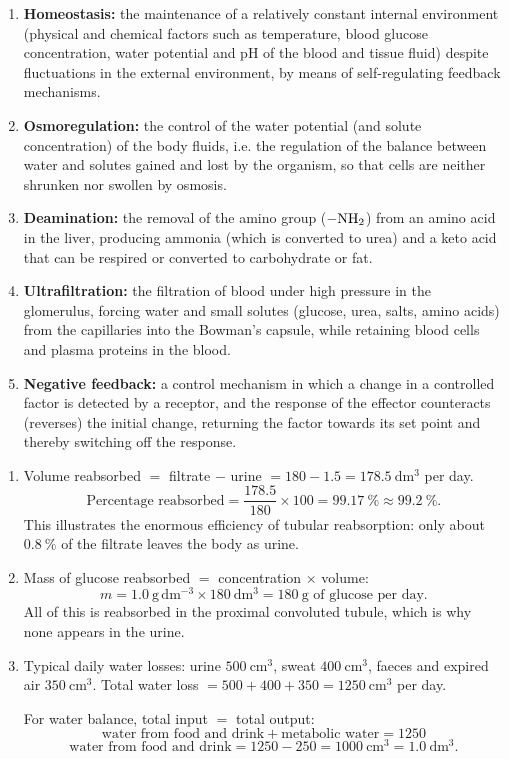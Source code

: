 \documentclass[11pt]{article}
\begin{document}
\begin{corrige}
\begin{enumerate}
\item \textbf{Homeostasis:} the maintenance of a relatively constant internal environment (physical and chemical factors such as temperature, blood glucose concentration, water potential and pH of the blood and tissue fluid) despite fluctuations in the external environment, by means of self-regulating feedback mechanisms.
\item \textbf{Osmoregulation:} the control of the water potential (and solute concentration) of the body fluids, i.e. the regulation of the balance between water and solutes gained and lost by the organism, so that cells are neither shrunken nor swollen by osmosis.
\item \textbf{Deamination:} the removal of the amino group ($-\ce{NH2}$) from an amino acid in the liver, producing ammonia (which is converted to urea) and a keto acid that can be respired or converted to carbohydrate or fat.
\item \textbf{Ultrafiltration:} the filtration of blood under high pressure in the glomerulus, forcing water and small solutes (glucose, urea, salts, amino acids) from the capillaries into the Bowman's capsule, while retaining blood cells and plasma proteins in the blood.
\item \textbf{Negative feedback:} a control mechanism in which a change in a controlled factor is detected by a receptor, and the response of the effector counteracts (reverses) the initial change, returning the factor towards its set point and thereby switching off the response.
\end{enumerate}
\end{corrige}

\begin{corrige}
\begin{enumerate}
\item Volume reabsorbed $=$ filtrate $-$ urine $= 180 - 1.5 = 178.5\ \mathrm{dm^3}$ per day.
\[ \text{Percentage reabsorbed} = \frac{178.5}{180} \times 100 = 99.17\ \% \approx 99.2\ \%. \]
This illustrates the enormous efficiency of tubular reabsorption: only about $0.8\ \%$ of the filtrate leaves the body as urine.
\item Mass of glucose reabsorbed $=$ concentration $\times$ volume:
\[ m = 1.0\ \mathrm{g\,dm^{-3}} \times 180\ \mathrm{dm^3} = 180\ \mathrm{g} \text{ of glucose per day.} \]
All of this is reabsorbed in the proximal convoluted tubule, which is why none appears in the urine.
\item Typical daily water losses: urine $500\ \mathrm{cm^3}$, sweat $400\ \mathrm{cm^3}$, faeces and expired air $350\ \mathrm{cm^3}$.
Total water loss $= 500 + 400 + 350 = 1250\ \mathrm{cm^3}$ per day.

For water balance, total input $=$ total output:
\[ \text{water from food and drink} + \text{metabolic water} = 1250 \]
\[ \text{water from food and drink} = 1250 - 250 = 1000\ \mathrm{cm^3} = 1.0\ \mathrm{dm^3}. \]
\end{enumerate}
\end{corrige}
\end{document}
